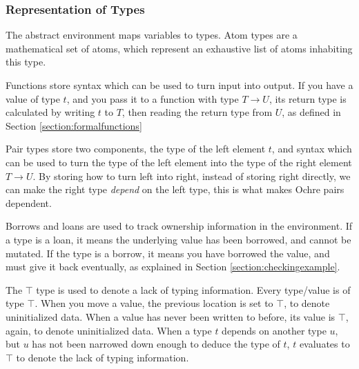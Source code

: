 \documentclass[12pt,twoside]{report}
\begin{document}
\subsubsection{Representation of Types}
The abstract environment maps variables to types. Atom types are a mathematical set of atoms, which represent an exhaustive list of atoms inhabiting this type.

Functions store syntax which can be used to turn input into output. If you have a value of type $t$, and you pass it to a function with type $T \rightarrow U$, its return type is calculated by writing $t$ to $T$, then reading the return type from $U$, as defined in Section \ref{section:formalfunctions}

Pair types store two components, the type of the left element $t$, and syntax which can be used to turn the type of the left element into the type of the right element $T \rightarrow U$. By storing how to turn left into right, instead of storing right directly, we can make the right type \textit{depend} on the left type, this is what makes Ochre pairs dependent.

Borrows and loans are used to track ownership information in the environment. If a type is a loan, it means the underlying value has been borrowed, and cannot be mutated. If the type is a borrow, it means you have borrowed the value, and must give it back eventually, as explained in Section \ref{section:checkingexample}.

The $\top$ type is used to denote a lack of typing information. Every type/value is of type $\top$. When you move a value, the previous location is set to $\top$, to denote uninitialized data. When a value has never been written to before, its value is $\top$, again, to denote uninitialized data. When a type $t$ depends on another type $u$, but $u$ has not been narrowed down enough to deduce the type of $t$, $t$ evaluates to $\top$ to denote the lack of typing information.
\end{document}

